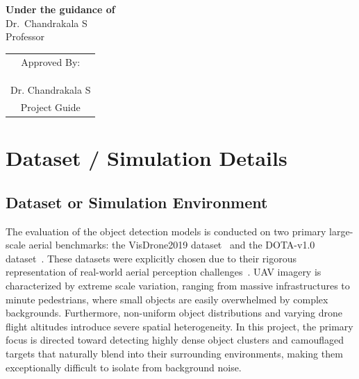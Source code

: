 \documentclass[12pt,a4paper]{report}
\begin{document}
\begin{titlepage}
\begin{center}
\vfill


{\large \textbf{Under the guidance of}}\\[0.2cm]
{\large Dr.\ Chandrakala S}\\
Professor\\
\vspace{0.6cm}
\begin{tabular}{c}
Approved By: \\
 \\
 \\
\shortstack{\rule{4cm}{0.4pt}\\
Dr. Chandrakala S\\
Project Guide}
\end{tabular}

\vfill



\end{center}
\end{titlepage}


\setcounter{chapter}{2}


\chapter{Dataset / Simulation Details}
\section{Dataset or Simulation Environment}
The evaluation of the object detection models is conducted on two primary large-scale aerial benchmarks: the VisDrone2019 dataset~\cite{zhu2021visdrone,du2018visdrone} and the DOTA-v1.0 dataset~\cite{xia2018dota,ding2021dota}. These datasets were explicitly chosen due to their rigorous representation of real-world aerial perception challenges~\cite{yang2026uavdet}. UAV imagery is characterized by extreme scale variation, ranging from massive infrastructures to minute pedestrians, where small objects are easily overwhelmed by complex backgrounds. Furthermore, non-uniform object distributions and varying drone flight altitudes introduce severe spatial heterogeneity. In this project, the primary focus is directed toward detecting highly dense object clusters and camouflaged targets that naturally blend into their surrounding environments, making them exceptionally difficult to isolate from background noise.
\end{document}
